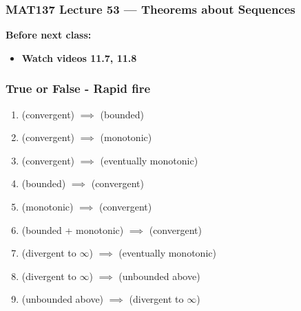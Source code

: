 \documentclass[14pt]{beamer}
\begin{document}
\begin{frame}
	\frametitle{MAT137 Lecture 53 --- Theorems about Sequences}

	\vfill
	{\bf Before next class:}
		\begin{itemize} \normalsize
			\item {\bf Watch videos 11.7, 11.8}
		\end{itemize}
\end{frame}
	\begin{frame}[t]
		\frametitle{True or False - Rapid fire}

		\begin{enumerate}
			\item (convergent) ${\displaystyle \implies}$ (bounded)
				\vfill

			\item (convergent) ${\displaystyle \implies}$ (monotonic)
				\vfill

			\item (convergent) ${\displaystyle \implies}$ (eventually monotonic)
				\vfill

			\item (bounded) ${\displaystyle \implies}$ (convergent)
				\vfill

			\item (monotonic) ${\displaystyle \implies}$ (convergent)
				\vfill

			\item (bounded + monotonic) ${\displaystyle \implies}$ (convergent)
				\vfill

			\item (divergent to $\infty$) ${\displaystyle \implies}$ (eventually
				monotonic)
				\vfill

			\item (divergent to $\infty$) ${\displaystyle \implies}$ (unbounded above)
				\vfill

			\item (unbounded above) ${\displaystyle \implies}$ (divergent to $\infty$)
		\end{enumerate}
		\vfill

		\vfill
	\end{frame}
\end{document}
